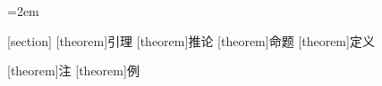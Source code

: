 \usepackage{indentfirst}
\parindent=2em
\linespread{1.25}

\def\abstractname{摘\quad 要}
\def\contentsname{目录}
\def\proofname{证明}


\usepackage{setspace}

\AtBeginDocument{
    \addtolength{\abovedisplayskip}{-3pt}
    \addtolength{\belowdisplayskip}{-3pt}
    \addtolength{\belowdisplayshortskip}{-3pt}
}


\theoremstyle{cjk-theorem}
[section]
[theorem]{引理}
[theorem]{推论}
[theorem]{命题}
[theorem]{定义}

\theoremstyle{cjk-definition}
[theorem]{注}
[theorem]{例}
\theoremstyle{cjk-theorem}

\makeatletter
\renewenvironment{proof}[1][\proofname]{\par
    \pushQED{\qed}%
    \normalfont \topsep6\p@\@plus6\p@\relax
    \trivlist
    \item\relax{\bfseries#1}\hspace{1em}\ignorespaces
}{\popQED\endtrivlist\@endpefalse}
\makeatother
